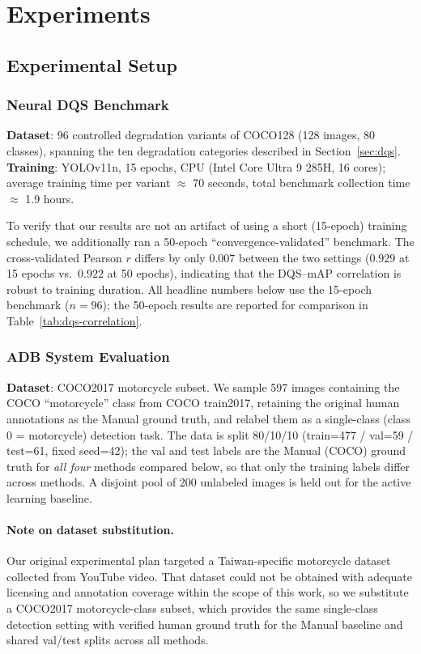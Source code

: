 \documentclass[11pt]{article}
\begin{document}
\section{Experiments}
\label{sec:experiments}

\subsection{Experimental Setup}

\subsubsection{Neural DQS Benchmark}

\textbf{Dataset}: 96 controlled degradation variants of COCO128 (128 images,
80 classes), spanning the ten degradation categories described in
Section~\ref{sec:dqs}.
\textbf{Training}: YOLOv11n, 15 epochs, CPU (Intel Core Ultra 9 285H, 16
cores); average training time per variant $\approx$ 70 seconds, total
benchmark collection time $\approx$ 1.9 hours.

To verify that our results are not an artifact of using a short (15-epoch)
training schedule, we additionally ran a 50-epoch ``convergence-validated''
benchmark. The cross-validated Pearson $r$ differs by only $0.007$ between
the two settings ($0.929$ at 15 epochs vs.\ $0.922$ at 50 epochs), indicating
that the DQS--mAP correlation is robust to training duration. All headline
numbers below use the 15-epoch benchmark ($n=96$); the 50-epoch results are
reported for comparison in Table~\ref{tab:dqs-correlation}.

\subsubsection{ADB System Evaluation}
\label{sec:adb-eval}

\textbf{Dataset}: COCO2017 motorcycle subset. We sample 597 images containing
the COCO ``motorcycle'' class from COCO train2017, retaining the original
human annotations as the Manual ground truth, and relabel them as a
single-class (class 0 = motorcycle) detection task. The data is split
80/10/10 (train=477 / val=59 / test=61, fixed seed=42); the val and test
labels are the Manual (COCO) ground truth for \emph{all four} methods
compared below, so that only the training labels differ across methods. A
disjoint pool of 200 unlabeled images is held out for the active learning
baseline.

\paragraph{Note on dataset substitution.} Our original experimental plan
targeted a Taiwan-specific motorcycle dataset collected from YouTube video.
That dataset could not be obtained with adequate licensing and annotation
coverage within the scope of this work, so we substitute a COCO2017
motorcycle-class subset, which provides the same single-class detection
setting with verified human ground truth for the Manual baseline and shared
val/test splits across all methods.
\end{document}
